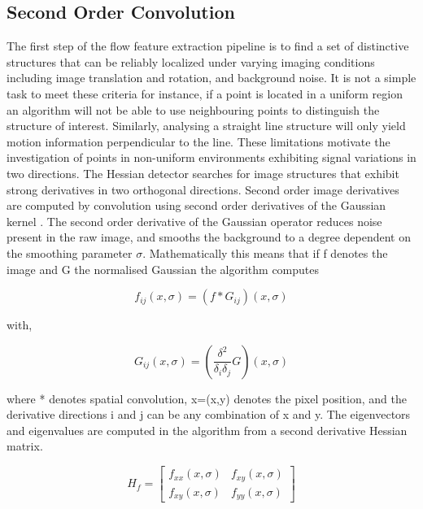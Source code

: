 \subsection{Second Order Convolution}
The first step of the flow feature extraction pipeline is to find a set of distinctive
structures that can be reliably localized under varying imaging conditions including image translation and rotation, and background noise. It is not a simple task to meet these criteria for instance, if a point is located in a uniform region an algorithm will not be able to use neighbouring points to distinguish the structure of interest. Similarly, analysing a straight line structure will only yield motion information perpendicular to the line. These limitations motivate the investigation of points in non-uniform environments exhibiting signal variations in two directions. The Hessian detector \citep{beaudet1978rotationally} searches for image structures that exhibit strong derivatives in two orthogonal directions. Second order image derivatives are computed by convolution using second order derivatives of the Gaussian kernel \citep{lindeberg1994linear}. The second order derivative of the Gaussian operator reduces  noise present in the raw image, and smooths the background to a degree dependent on the smoothing parameter $\sigma$. Mathematically this means that if f denotes the image and G the normalised Gaussian the algorithm computes

\begin{equation}
f_{ij}(x,\sigma) = (f*G_{ij})(x,\sigma)
\end{equation}

with,

\begin{equation}
G_{ij}(x,\sigma)=\left(\frac{\delta^2}{\delta_i\delta_j}G\right)(x,\sigma)
\end{equation}

where * denotes spatial convolution, x=(x,y) denotes the pixel position, and the derivative directions i and j can be any combination of x and y. The eigenvectors and eigenvalues are computed in the algorithm from a second derivative Hessian matrix.

\begin{equation} \label{eqn:hessian}
H_f=
  \begin{bmatrix}
    f_{xx}(x,\sigma) & f_{xy}(x,\sigma) \\
    f_{xy}(x,\sigma) & f_{yy}(x,\sigma)
  \end{bmatrix}
\end{equation}

